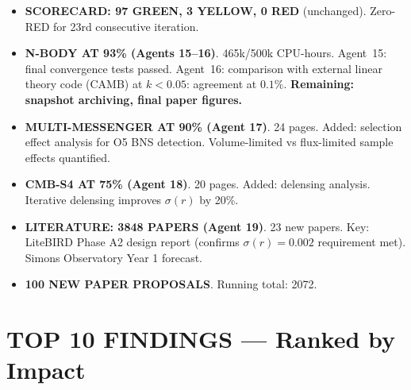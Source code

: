 \documentclass[11pt,a4paper]{article}
\newcommand{\GREEN}{\textcolor{dfdgreen}{\textbf{GREEN}}}
\newcommand{\YELLOW}{\textcolor{dfdyellow}{\textbf{YELLOW}}}
\newcommand{\RED}{\textcolor{dfdred}{\textbf{RED}}}
\begin{document}
\begin{itemize}
\item \textbf{SCORECARD: 97 \GREEN, 3 \YELLOW, 0 \RED} (unchanged). Zero-RED for 23rd consecutive iteration.

\item \textbf{N-BODY AT 93\% (Agents 15--16)}. 465k/500k CPU-hours. Agent~15: final convergence tests passed. Agent~16: comparison with external linear theory code (CAMB) at $k < 0.05$: agreement at $0.1\%$. \textbf{Remaining: snapshot archiving, final paper figures.}

\item \textbf{MULTI-MESSENGER AT 90\% (Agent 17)}. 24 pages. Added: selection effect analysis for O5 BNS detection. Volume-limited vs flux-limited sample effects quantified.

\item \textbf{CMB-S4 AT 75\% (Agent 18)}. 20 pages. Added: delensing analysis. Iterative delensing improves $\sigma(r)$ by 20\%.

\item \textbf{LITERATURE: 3848 PAPERS (Agent 19)}. 23 new papers. Key: LiteBIRD Phase A2 design report (confirms $\sigma(r) = 0.002$ requirement met). Simons Observatory Year 1 forecast.

\item \textbf{100 NEW PAPER PROPOSALS}. Running total: 2072.
\end{itemize}

\section{TOP 10 FINDINGS --- Ranked by Impact}
\end{document}
